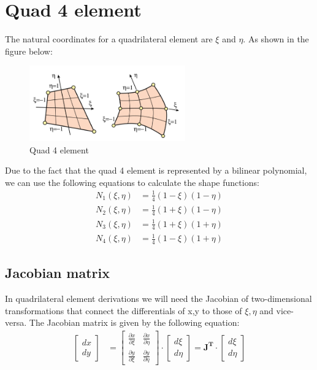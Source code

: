 \documentclass{article}  %
\begin{document}
\section{Quad 4 element}
The natural coordinates for a quadrilateral element are $\xi$ and $\eta$. As shown in the figure below:
\begin{figure}[h]
    \centering
    \includegraphics[width=0.6\textwidth]{Graphics/quad_4.PNG}
    \caption{Quad 4 element}
    \label{fig:quad_4_element}
\end{figure}

Due to the fact that the quad 4 element is represented by a bilinear polynomial, we can use the following equations to calculate the shape functions:
\begin{align}
  N_1(\xi,\eta) &= \frac{1}{4} (1-\xi)(1-\eta) \\
  N_2(\xi,\eta) &= \frac{1}{4} (1+\xi)(1-\eta) \\
  N_3(\xi,\eta) &= \frac{1}{4} (1+\xi)(1+\eta) \\
  N_4(\xi,\eta) &= \frac{1}{4} (1-\xi)(1+\eta)
\end{align}

\subsection{Jacobian matrix}
In quadrilateral element derivations we will need the Jacobian of two-dimensional transformations that connect the differentials of {x,y} to those of {$\xi, \eta$} and vice-versa.
The Jacobian matrix is given by the following equation:
\begin{align}
  \begin{bmatrix}
    dx \\
    dy
  \end{bmatrix}
  & = \begin{bmatrix}
    \frac{\partial x}{\partial \xi} & \frac{\partial x}{\partial \eta} \\
    \frac{\partial y}{\partial \xi} & \frac{\partial y}{\partial \eta}
  \end{bmatrix}
  \cdot
  \begin{bmatrix}
    d\xi \\
    d\eta
  \end{bmatrix}
   = \mathbf{J^T} \cdot \begin{bmatrix}
    d\xi \\
    d\eta
  \end{bmatrix}
\end{align}
\end{document}
